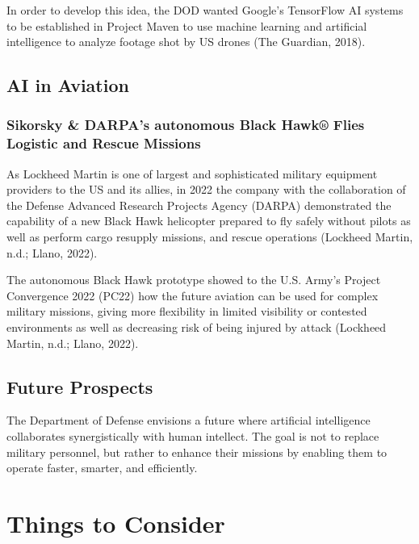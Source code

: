 \documentclass[
]{article}
\begin{document}
In order to develop this idea, the DOD wanted Google's TensorFlow AI systems to be established in Project Maven to use machine learning and artificial intelligence to analyze footage shot by US drones (The Guardian, 2018).

\hypertarget{ai-in-aviation}{%
\subsection{AI in Aviation}\label{ai-in-aviation}}

\hypertarget{sikorsky-darpas-autonomous-black-hawk-flies-logistic-and-rescue-missions}{%
\subsubsection{Sikorsky \& DARPA's autonomous Black Hawk® Flies Logistic and Rescue Missions}\label{sikorsky-darpas-autonomous-black-hawk-flies-logistic-and-rescue-missions}}

As Lockheed Martin is one of largest and sophisticated military equipment providers to the US and its allies, in 2022 the company with the collaboration of the Defense Advanced Research Projects Agency (DARPA) demonstrated the capability of a new Black Hawk helicopter prepared to fly safely without pilots as well as perform cargo resupply missions, and rescue operations (Lockheed Martin, n.d.; Llano, 2022).

The autonomous Black Hawk prototype showed to the U.S. Army's Project Convergence 2022 (PC22) how the future aviation can be used for complex military missions, giving more flexibility in limited visibility or contested environments as well as decreasing risk of being injured by attack (Lockheed Martin, n.d.; Llano, 2022).

\hypertarget{future-prospects}{%
\subsection{Future Prospects}\label{future-prospects}}

The Department of Defense envisions a future where artificial intelligence collaborates synergistically with human intellect. The goal is not to replace military personnel, but rather to enhance their missions by enabling them to operate faster, smarter, and efficiently.

\hypertarget{things-to-consider}{%
\section{Things to Consider}\label{things-to-consider}}
\end{document}
